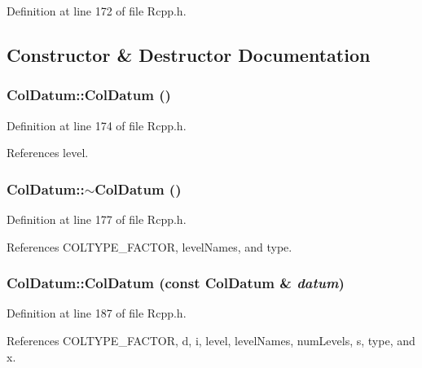 Definition at line 172 of file Rcpp.h.

\subsection{Constructor \& Destructor Documentation}
\hypertarget{classColDatum_ab0aa09b7e8d9acd2b0435b256c6b4da7}{
\subsubsection[{ColDatum}]{\setlength{\rightskip}{0pt plus 5cm}ColDatum::ColDatum ()}}
\label{classColDatum_ab0aa09b7e8d9acd2b0435b256c6b4da7}


Definition at line 174 of file Rcpp.h.

References level.\hypertarget{classColDatum_accc1e3ec9da32643bd4953f983165b64}{
\subsubsection[{$\sim$ColDatum}]{\setlength{\rightskip}{0pt plus 5cm}ColDatum::$\sim$ColDatum ()}}
\label{classColDatum_accc1e3ec9da32643bd4953f983165b64}


Definition at line 177 of file Rcpp.h.

References COLTYPE\_\-FACTOR, levelNames, and type.\hypertarget{classColDatum_a0507c6e2b4c76ee5364af001855fbe4e}{
\subsubsection[{ColDatum}]{\setlength{\rightskip}{0pt plus 5cm}ColDatum::ColDatum (const {\bf ColDatum} \& {\em datum})}}
\label{classColDatum_a0507c6e2b4c76ee5364af001855fbe4e}


Definition at line 187 of file Rcpp.h.

References COLTYPE\_\-FACTOR, d, i, level, levelNames, numLevels, s, type, and x.

